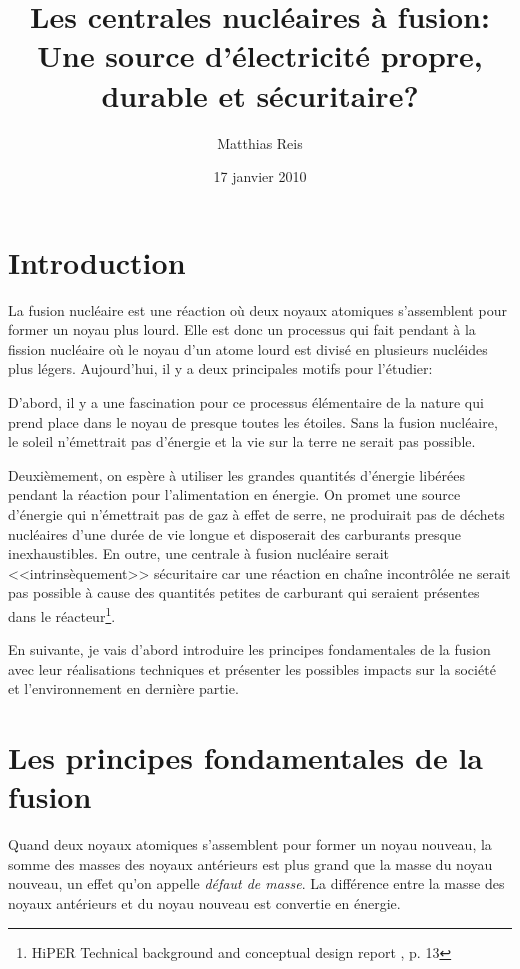 \documentclass[12pt,a4paper]{article}
\date{17 janvier 2010}
\title{Les centrales nucléaires à fusion: Une source d'électricité propre, durable et sécuritaire?}
\author{Matthias Reis}
\begin{document}
\maketitle \newpage
\tableofcontents \newpage

\section{Introduction}
La fusion nucléaire est une réaction où deux noyaux atomiques s'assemblent pour former un noyau plus lourd. Elle est donc un processus qui fait pendant à la fission nucléaire où le noyau d'un atome lourd est divisé en plusieurs nucléides plus légers. Aujourd'hui, il y a deux principales motifs pour l'étudier: %

D'abord, il y a une fascination pour ce processus élémentaire de la nature qui prend place dans le noyau de presque toutes les étoiles. Sans la fusion nucléaire, le soleil n'émettrait pas d'énergie et la vie sur la terre ne serait pas possible.

Deuxièmement, on espère à utiliser les grandes quantités d'énergie libérées pendant la réaction pour l'alimentation en énergie. On promet une source d'énergie qui n'émettrait pas de gaz à effet de serre, ne produirait pas de déchets nucléaires d'une durée de vie longue et disposerait des carburants presque inexhaustibles. En outre, une centrale à fusion nucléaire serait <<intrinsèquement>> sécuritaire car une réaction en chaîne incontrôlée ne serait pas possible à cause des quantités petites de carburant qui seraient présentes dans le réacteur\footnote{HiPER Technical background and conceptual design report \cite{hiper}, p. 13}.

En suivante, je vais d'abord introduire les principes fondamentales de la fusion avec leur réalisations techniques et présenter les possibles impacts sur la société et l'environnement en dernière partie. 

\section{Les principes fondamentales de la fusion}
Quand deux noyaux atomiques s'assemblent pour former un noyau nouveau, la somme des masses des noyaux antérieurs est plus grand que la masse du noyau nouveau, un effet qu'on appelle \textit{défaut de masse}. La différence entre la masse des noyaux antérieurs et du noyau nouveau est convertie en énergie.
\end{document}
